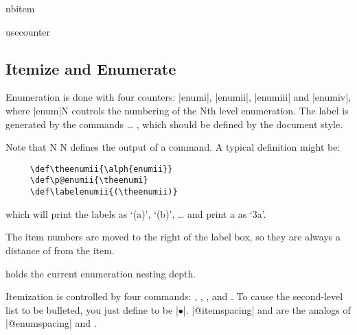     \begin{teX}
\def\makelabel#1{%
  \@latex@error{Lonely \string\item--perhaps a missing
        list environment}\@ehc}
    \end{teX}
 

 \begin{docCommand}{nbitem}{}
 \end{docCommand}
    \begin{teX}
\def\@nbitem{%
  \@tempskipa\@outerparskip
  \advance\@tempskipa -\parskip
  \addvspace\@tempskipa}
    \end{teX}

 \begin{docCommand}{usecounter}{}
 \end{docCommand}
    \begin{teX}
\def\usecounter#1{\@nmbrlisttrue\def\@listctr{#1}\setcounter{#1}\z@}
    \end{teX}


 \subsection{Itemize and Enumerate}

  Enumeration is done with four counters: |enumi|, |enumii|, |enumiii|
  and |enumiv|, where |enum|N controls the numbering of the Nth level
  enumeration.  The label is generated by the commands
   \ldots{} , which should be defined
  by the document style.
  
  Note that N N defines the output
  of a  command.  A typical definition might be:
  
 \begin{verbatim}
     \def\theenumii{\alph{enumii}}
     \def\p@enumii{\theenumi}
     \def\labelenumii{(\theenumii)}
 \end{verbatim}
 which will print the labels as `(a)', `(b)', \ldots
 and print a  as `3a'.

 The item numbers are moved to the right of the label box, so they are
 always a distance of  from the item.

  holds the current enumeration nesting depth.

 Itemization is controlled by four commands: ,
 ,
 , and .
 To cause the second-level list to be
 bulleted, you just define 
 to be |$\bullet$|.  |@itemspacing|
 and  are the analogs of |@enumspacing| and
 .


